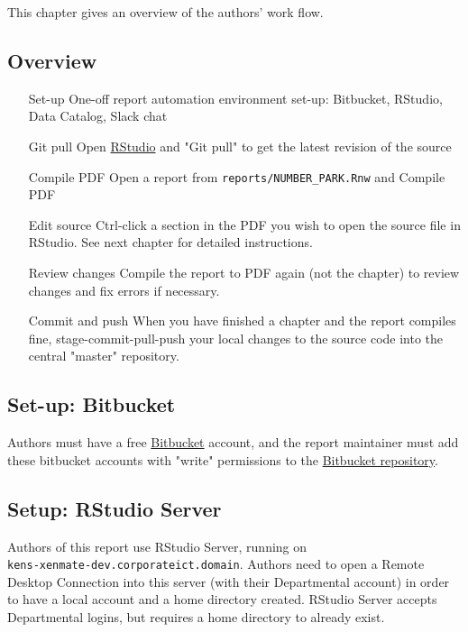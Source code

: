 This chapter gives an overview of the authors' work flow.

\subsection*{Overview}

\begin{itemize}
	\item[Set-up]
		One-off report automation environment set-up: Bitbucket, RStudio,
		Data Catalog, Slack chat
	\item[Git pull]
		Open \href{https://rstudio.dpaw.wa.gov.au/}{RStudio} and "Git pull" to
		get the latest revision of the source
	\item[Compile PDF]
		Open a report from \texttt{reports/NUMBER\_PARK.Rnw} and Compile PDF
	\item[Edit source]
		Ctrl-click a section in the PDF you wish to open the source file in RStudio.
		See next chapter for detailed instructions.
	\item[Review changes]
		Compile the report to PDF again (not the chapter) to review changes and
		fix errors if necessary.
	\item[Commit and push]
		When you have finished a chapter and the report compiles fine,
		stage-commit-pull-push your local changes to the source code into the
		central "master" repository.
\end{itemize}

\subsection*{Set-up: Bitbucket}
Authors must have a free \href{https://bitbucket.org/}{Bitbucket} account, and
the report maintainer must add these bitbucket accounts with "write" permissions to
the \href{https://bitbucket.org/dpaw/mpa-reporting/}{Bitbucket repository}.

\subsection*{Setup: RStudio Server}
Authors of this report use RStudio Server, running on \\
\texttt{kens-xenmate-dev.corporateict.domain}.
Authors need to open a Remote Desktop Connection into this server (with their
Departmental account) in order to have a local account and a home directory
created. RStudio Server accepts Departmental logins, but requires a home
directory to already exist.

